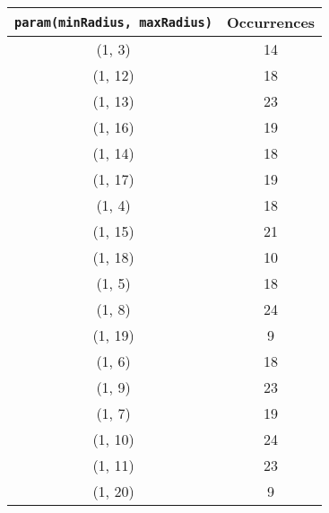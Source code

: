 \documentclass[letterpaper, 12pt]{article}
\begin{document}
\begin{longtable}{|c|c|}
\hline
\textbf{\texttt{param(minRadius, maxRadius)}} & \textbf{Occurrences} \\
\hline
(1, 3) & 14 \\
\hline
(1, 12) & 18 \\
\hline
(1, 13) & 23 \\
\hline
(1, 16) & 19 \\
\hline
(1, 14) & 18 \\
\hline
(1, 17) & 19 \\
\hline
(1, 4) & 18 \\
\hline
(1, 15) & 21 \\
\hline
(1, 18) & 10 \\
\hline
(1, 5) & 18 \\
\hline
(1, 8) & 24 \\
\hline
(1, 19) & 9 \\
\hline
(1, 6) & 18 \\
\hline
(1, 9) & 23 \\
\hline
(1, 7) & 19 \\
\hline
(1, 10) & 24 \\
\hline
(1, 11) & 23 \\
\hline
(1, 20) & 9 \\
\hline
\end{longtable}
\end{document}

